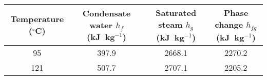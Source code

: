 \begin{center}
\begin{tabular}{|c|c|c|c|}
\hline
\textbf{Temperature} ($^\circ$C) & \textbf{Condensate water} $h_f$ (kJ~kg$^{-1}$) & \textbf{Saturated steam} $h_g$ (kJ~kg$^{-1}$) & \textbf{Phase change} $h_{fg}$ (kJ~kg$^{-1}$) \\ \hline
95  & 397.9  & 2668.1 & 2270.2 \\ \hline
121 & 507.7  & 2707.1 & 2205.2 \\  \hline
\end{tabular}
\end{center}